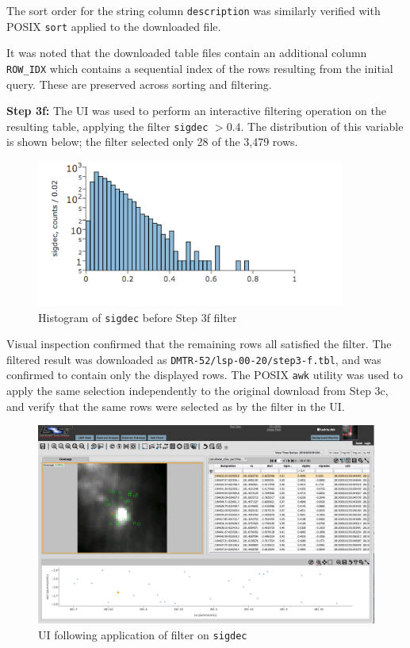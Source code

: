 The sort order for the string column \verb|description| was similarly verified with POSIX \verb|sort| applied to the downloaded file.

It was noted that the downloaded table files contain an additional column \verb|ROW_IDX| which contains a sequential index of the rows resulting from the initial query.
These are preserved across sorting and filtering.

\textbf{Step 3f:} The UI was used to perform an interactive filtering operation on the resulting table,
applying the filter \verb|sigdec| $> 0.4$.
The distribution of this variable is shown below; the filter selected only 28 of the 3,479 rows.

\begin{figure}
  \centering
  \includegraphics[width=4in]{lsp-00-20/step3-f-sigdec-hist.png}
  \caption{Histogram of \texttt{sigdec} before Step 3f filter}
  \label{fig:lsp-00-20-sigdec-hist}
\end{figure}

Visual inspection confirmed that the remaining rows all satisfied the filter.
The filtered result was downloaded as \verb|DMTR-52/lsp-00-20/step3-f.tbl|,
and was confirmed to contain only the displayed rows.
The POSIX \verb|awk| utility was used to apply the same selection independently to the original download from Step 3c,
and verify that the same rows were selected as by the filter in the UI.

\begin{figure}
  \includegraphics[width=\linewidth]{lsp-00-20/step3-f.png}
  \caption{UI following application of filter on \texttt{sigdec}}
  \label{fig:lsp-00-20-sigdec-filter}
\end{figure}

